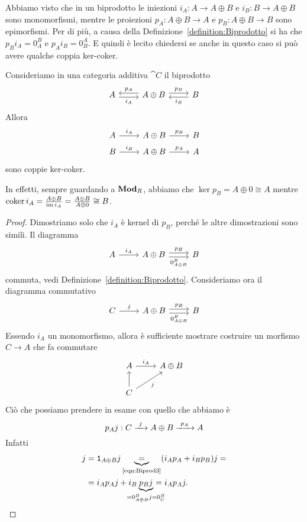 Abbiamo visto che in un biprodotto le iniezioni
\(i_A : A \to A \oplus B\) e \(i_B : B \to A \oplus B\) sono
monomorfismi, mentre le proiezioni \(p_A : A \oplus B \to A\) e
\(p_B : A \oplus B \to B\) sono epimorfismi. Per di più, a causa della
Definizione~\ref{definition:Biprodotto} si ha che \(p_B i_A = 0_A^B\) e
\(p_A i_B = 0_B^A\). E quindi è lecito chiedersi se anche in questo caso
si può avere qualche coppia ker-coker.

\begin{lemma}\label{lemma:KerCokerInjProj}
  Consideriamo in una categoria additiva \(\cat C\) il biprodotto
  \[
    \begin{tikzcd}
      A \ar["{i_A}", r, shift right, swap] & A \oplus B \ar["{p_A}", l,
      shift right, swap] \ar["{p_B}", r, shift left] & B \ar["{i_B}", l,
      shift left]
    \end{tikzcd}
  \]
  Allora
  \[
    \begin{tikzcd}[row sep=tiny]
      A \ar["{i_A}", r] & A \oplus B \ar["{p_B}", r] & B \\
      B \ar["{i_B}", r] & A \oplus B \ar["{p_A}", r] & A
    \end{tikzcd}
  \]
  sono coppie ker-coker.
\end{lemma}

In effetti, sempre guardando a \(\mathbf{Mod}_R\), abbiamo che
\(\ker p_B = A \oplus 0 \cong A\) mentre
\(\operatorname{coker} i_A = \frac{A \oplus B}{\operatorname{im} i_A} = \frac{A \oplus B}{A \oplus
  0} \cong B\).

\begin{proof}
  Dimostriamo solo che \(i_A\) è kernel di \(p_B\), perché le altre
  dimostrazioni sono simili. Il diagramma
  \[
    \begin{tikzcd}
      A \ar["{i_A}", r] & A \oplus B \ar["{p_B}", r, shift left]
      \ar["{0_{A \oplus B}^B}", r, shift right, swap] & B
    \end{tikzcd}
  \]
  commuta, vedi Definizione~\ref{definition:Biprodotto}. Consideriamo
  ora il diagramma commutativo
  \[
    \begin{tikzcd}
      C \ar["{j}", r] & A \oplus B \ar["{p_B}", r, shift left]
      \ar["{0_{A \oplus B}^B}", r, shift right, swap] & B
    \end{tikzcd}
  \]
  Essendo \(i_A\) un monomorfismo, allora è sufficiente mostrare
  costruire un morfismo \(C \to A\) che fa commutare
  \[
    \begin{tikzcd}
      A \ar["{i_A}",r] & A \oplus B \\
      C \ar[u] \ar["{j}", ur, swap]
    \end{tikzcd}
  \]
  Ciò che possiamo prendere in esame con quello che abbiamo è
  \[
    p_A j : C \xrightarrow{\ j\ } A \oplus B \xrightarrow{\ p_A\ } A
  \]
  Infatti
  \begin{align*}
    j &= \id_{A \oplus B} j \underbrace{=}_{\text{\eqref{eqn:Biprod3}}}
        (i_A p_A + i_B p_B) j = \\
      &= i_A p_A j + i_B \underbrace{p_B j}_{\mathclap{\cramped{= 0_{A \oplus B}^B j = 0_C^B}}} = i_A p_A j . \qedhere
  \end{align*}
\end{proof}

